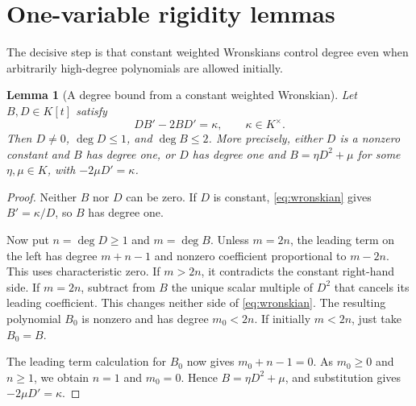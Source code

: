 \documentclass[11pt,a4paper]{article}
\numberwithin{equation}{section}
\newtheorem{lemma}[theorem]{Lemma}
\theoremstyle{definition}
\theoremstyle{remark}
\begin{document}
\section{One-variable rigidity lemmas}
\label{sec:lemmas}

The decisive step is that constant weighted Wronskians control degree even
when arbitrarily high-degree polynomials are allowed initially.

\begin{lemma}[A degree bound from a constant weighted Wronskian]
\label{lem:wronskian}
Let $B,D\in K[t]$ satisfy
\begin{equation}\label{eq:wronskian}
DB'-2BD'=\kappa,\qquad \kappa\in K^\times.
\end{equation}
Then $D\ne0$, $\deg D\le1$, and $\deg B\le2$. More precisely, either $D$
is a nonzero constant and $B$ has degree one, or $D$ has degree one and
$B=\eta D^2+\mu$ for some $\eta,\mu\in K$, with
$-2\mu D'=\kappa$.
\end{lemma}
\begin{proof}
Neither $B$ nor $D$ can be zero. If $D$ is constant, \eqref{eq:wronskian}
gives $B'=\kappa/D$, so $B$ has degree one.

Now put $n=\deg D\ge1$ and $m=\deg B$. Unless $m=2n$, the leading term
on the left has degree $m+n-1$ and nonzero coefficient proportional to
$m-2n$. This uses characteristic zero. If $m>2n$, it contradicts the
constant right-hand side. If $m=2n$, subtract from $B$ the unique scalar
multiple of $D^2$ that cancels its leading coefficient. This changes
neither side of \eqref{eq:wronskian}. The resulting polynomial $B_0$ is
nonzero and has degree $m_0<2n$. If initially $m<2n$, just take $B_0=B$.

The leading term calculation for $B_0$ now gives $m_0+n-1=0$. As
$m_0\ge0$ and $n\ge1$, we obtain $n=1$ and $m_0=0$. Hence
$B=\eta D^2+\mu$, and substitution gives $-2\mu D'=\kappa$.
\end{proof}
\end{document}
